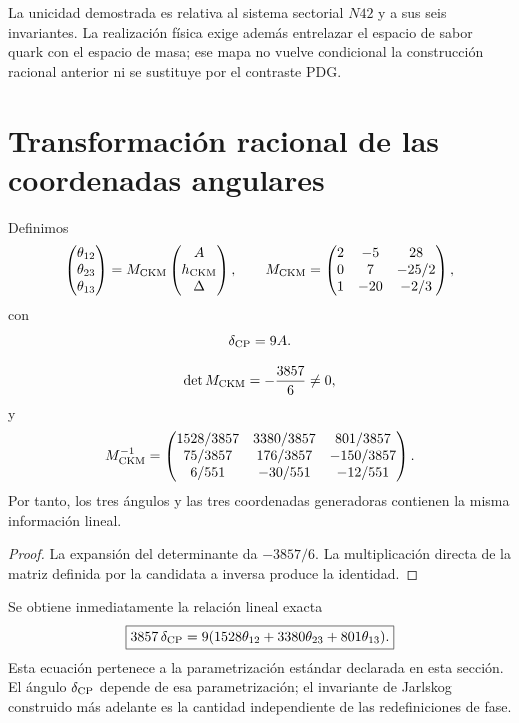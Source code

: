 La unicidad demostrada es relativa al sistema sectorial \(N42\) y a sus
seis invariantes. La realización física exige además entrelazar el espacio
de sabor quark con el espacio de masa; ese mapa no vuelve condicional la
construcción racional anterior ni se sustituye por el contraste PDG.

\section{Transformación racional de las coordenadas angulares}

Definimos
\[
 \begin{pmatrix}\theta_{12}\\\theta_{23}\\\theta_{13}\end{pmatrix}
 =M_{\rm CKM}
 \begin{pmatrix}A\\h_{\rm CKM}\\\Delta\end{pmatrix},
 \qquad
 M_{\rm CKM}=
 \begin{pmatrix}
 2&-5&28\\
 0&7&-25/2\\
 1&-20&-2/3
 \end{pmatrix},
\]
con
\[
 \delta_{\rm CP}=9A.
\]

\begin{theorem}
\[
 \det M_{\rm CKM}=-\frac{3857}{6}\ne0,
\]
y
\[
 M_{\rm CKM}^{-1}=
 \begin{pmatrix}
 1528/3857&3380/3857&801/3857\\
 75/3857&176/3857&-150/3857\\
 6/551&-30/551&-12/551
 \end{pmatrix}.
\]
Por tanto, los tres ángulos y las tres coordenadas generadoras contienen la
misma información lineal.
\end{theorem}
\begin{proof}
La expansión del determinante da \(-3857/6\). La multiplicación directa de
la matriz definida por la candidata a inversa produce la identidad.
\end{proof}

Se obtiene inmediatamente la relación lineal exacta
\[
\boxed{
 3857\,\delta_{\rm CP}
 =9(1528\theta_{12}+3380\theta_{23}+801\theta_{13}).}
\]
Esta ecuación pertenece a la parametrización estándar declarada en esta
sección. El ángulo \(\delta_{\rm CP}\) depende de esa parametrización; el
invariante de Jarlskog construido más adelante es la cantidad independiente
de las redefiniciones de fase.

